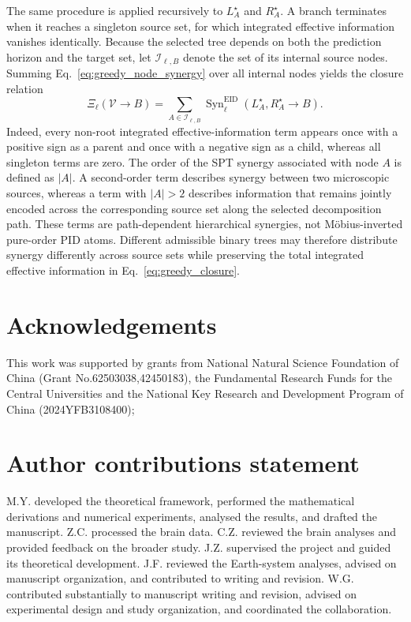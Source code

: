 \documentclass[fleqn,10pt]{wlscirep}
\theoremstyle{naturetheorem}
\begin{document}
The same procedure is applied recursively to
\(L_A^{\star}\) and \(R_A^{\star}\). A branch terminates when it reaches a
singleton source set, for which integrated effective information vanishes
identically. Because the selected tree depends on both the prediction horizon
and the target set, let \(\mathcal{I}_{\ell,B}\) denote the set of its internal
source nodes. Summing Eq.~\eqref{eq:greedy_node_synergy} over all internal
nodes yields the closure relation
\begin{equation}
    \Xi_{\ell}(\mathcal{V}\rightarrow B)
    =
    \sum_{A\in\mathcal{I}_{\ell,B}}
    \operatorname{Syn}^{\mathrm{EID}}_{\ell}
    \left(
        L_A^{\star},R_A^{\star}\rightarrow B
    \right).
    \label{eq:greedy_closure}
\end{equation}
Indeed, every non-root integrated effective-information term appears once
with a positive sign as a parent and once with a negative sign as a child,
whereas all singleton terms are zero. The order of the SPT synergy associated with node \(A\) is defined
as \(|A|\). A second-order term describes synergy between two microscopic
sources, whereas a term with \(|A|>2\) describes information that remains
jointly encoded across the corresponding source set along the selected
decomposition path. These terms are path-dependent hierarchical synergies,
not Möbius-inverted pure-order PID atoms. Different admissible binary trees
may therefore distribute synergy differently across source sets while
preserving the total integrated effective information in
Eq.~\eqref{eq:greedy_closure}.

\section*{Acknowledgements}

This work was supported by grants from National Natural Science Foundation of China (Grant No.62503038,42450183), the Fundamental Research Funds for the Central Universities and the National Key Research and Development Program of China (2024YFB3108400);

\section*{Author contributions statement}

M.Y. developed the theoretical framework, performed the mathematical derivations and numerical experiments, analysed the results, and drafted the manuscript. Z.C. processed the brain data. C.Z. reviewed the brain analyses and provided feedback on the broader study. J.Z. supervised the project and guided its theoretical development. J.F. reviewed the Earth-system analyses, advised on manuscript organization, and contributed to writing and revision. W.G. contributed substantially to manuscript writing and revision, advised on experimental design and study organization, and coordinated the collaboration.



\end{document}
